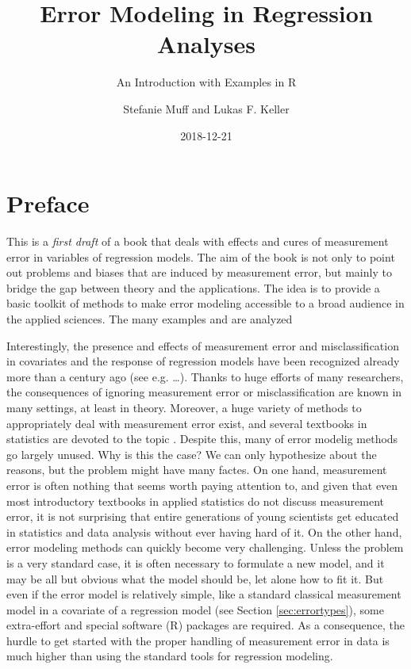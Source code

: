 \documentclass[]{book}
\title{Error Modeling in Regression Analyses}
\subtitle{An Introduction with Examples in R}
\author{Stefanie Muff and Lukas F. Keller}
\date{2018-12-21}
\theoremstyle{definition}
\theoremstyle{definition}
\theoremstyle{definition}
\theoremstyle{remark}
\begin{document}
\maketitle

{
\setcounter{tocdepth}{1}
\tableofcontents
}
\chapter*{Preface}\label{preface}

This is a \emph{first draft} of a book that deals with effects and cures
of measurement error in variables of regression models. The aim of the
book is not only to point out problems and biases that are induced by
measurement error, but mainly to bridge the gap between theory and the
applications. The idea is to provide a basic toolkit of methods to make
error modeling accessible to a broad audience in the applied sciences.
The many examples and are analyzed

Interestingly, the presence and effects of measurement error and
misclassification in covariates and the response of regression models
have been recognized already more than a century ago (see e.g.
\ldots{}). Thanks to huge efforts of many researchers, the consequences
of ignoring measurement error or misclassification are known in many
settings, at least in theory. Moreover, a huge variety of methods to
appropriately deal with measurement error exist, and several textbooks
in statistics are devoted to the topic
\citep{fuller1987, gustafson2004, carroll.etal2006, yi2017}. Despite
this, many of error modelig methods go largely unused. Why is this the
case? We can only hypothesize about the reasons, but the problem might
have many factes. On one hand, measurement error is often nothing that
seems worth paying attention to, and given that even most introductory
textbooks in applied statistics do not discuss measurement error, it is
not surprising that entire generations of young scientists get educated
in statistics and data analysis without ever having hard of it. On the
other hand, error modeling methods can quickly become very challenging.
Unless the problem is a very standard case, it is often necessary to
formulate a new model, and it may be all but obvious what the model
should be, let alone how to fit it. But even if the error model is
relatively simple, like a standard classical measurement model in a
covariate of a regression model (see Section \ref{sec:errortypes}), some
extra-effort and special software (R) packages are required. As a
consequence, the hurdle to get started with the proper handling of
measurement error in data is much higher than using the standard tools
for regression modeling.
\end{document}
